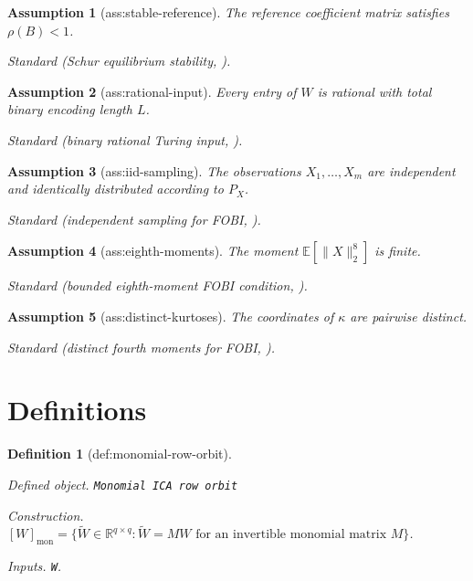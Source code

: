 \documentclass{article}
\newtheorem{assumption}{Assumption}
\newtheorem{definition}{Definition}
\begin{document}
\begin{assumption}[ass:stable-reference]\label{ass:stable-reference}
The reference coefficient matrix satisfies \(\rho(B)<1\).
\par\smallskip\noindent\emph{Standard} (Schur equilibrium stability, \cite{LacerdaSpirtesRamseyHoyer2008}).
\end{assumption}

\begin{assumption}[ass:rational-input]\label{ass:rational-input}
Every entry of \(W\) is rational with total binary encoding length \(L\).
\par\smallskip\noindent\emph{Standard} (binary rational Turing input, \cite{Valiant1979}).
\end{assumption}

\begin{assumption}[ass:iid-sampling]\label{ass:iid-sampling}
The observations \(X_1,\ldots,X_m\) are independent and identically distributed according to \(P_X\).
\par\smallskip\noindent\emph{Standard} (independent sampling for FOBI, \cite{MiettinenTaskinenNordhausenOja2015}).
\end{assumption}

\begin{assumption}[ass:eighth-moments]\label{ass:eighth-moments}
The moment \(\mathbb E[\|X\|_2^8]\) is finite.
\par\smallskip\noindent\emph{Standard} (bounded eighth-moment FOBI condition, \cite{MiettinenTaskinenNordhausenOja2015}).
\end{assumption}

\begin{assumption}[ass:distinct-kurtoses]\label{ass:distinct-kurtoses}
The coordinates of \(\kappa\) are pairwise distinct.
\par\smallskip\noindent\emph{Standard} (distinct fourth moments for FOBI, \cite{MiettinenTaskinenNordhausenOja2015}).
\end{assumption}

\section{Definitions}

\begin{definition}[def:monomial-row-orbit]\label{def:monomial-row-orbit}
\par\smallskip\noindent\emph{Defined object.} \texttt{Monomial ICA row orbit}
\par\smallskip\noindent\emph{Construction.} \([W]_{\mathrm{mon}}=\{\widetilde W\in\mathbb R^{q\times q}:\widetilde W=MW\text{ for an invertible monomial matrix }M\}\).
\par\smallskip\noindent\emph{Inputs.} \texttt{W}.
\end{definition}
\end{document}

